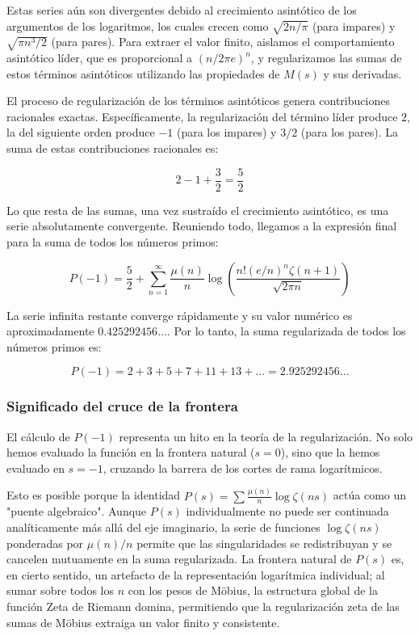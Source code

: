 Estas series aún son divergentes debido al crecimiento asintótico de los argumentos de los logaritmos, los cuales crecen como $\sqrt{2n/\pi}$ (para impares) y $\sqrt{\pi n^3/2}$ (para pares). Para extraer el valor finito, aislamos el comportamiento asintótico líder, que es proporcional a $(n/2\pi e)^n$, y regularizamos las sumas de estos términos asintóticos utilizando las propiedades de $M(s)$ y sus derivadas. 

El proceso de regularización de los términos asintóticos genera contribuciones racionales exactas. Específicamente, la regularización del término líder produce $2$, la del siguiente orden produce $-1$ (para los impares) y $3/2$ (para los pares). La suma de estas contribuciones racionales es:

$$ 2 - 1 + \frac{3}{2} = \frac{5}{2} $$

Lo que resta de las sumas, una vez sustraído el crecimiento asintótico, es una serie absolutamente convergente. Reuniendo todo, llegamos a la expresión final para la suma de todos los números primos:

$$ P(-1) = \frac{5}{2} + \sum_{n=1}^{\infty} \frac{\mu(n)}{n} \log \left( \frac{n! (e/n)^n \zeta(n+1)}{\sqrt{2\pi n}} \right) $$

La serie infinita restante converge rápidamente y su valor numérico es aproximadamente $0.425292456\dots$. Por lo tanto, la suma regularizada de todos los números primos es:

$$ P(-1) = 2 + 3 + 5 + 7 + 11 + 13 + \dots = 2.925292456\dots $$

\subsubsection{Significado del cruce de la frontera}

El cálculo de $P(-1)$ representa un hito en la teoría de la regularización. No solo hemos evaluado la función en la frontera natural ($s=0$), sino que la hemos evaluado en $s=-1$, cruzando la barrera de los cortes de rama logarítmicos. 

Esto es posible porque la identidad $P(s) = \sum \frac{\mu(n)}{n} \log \zeta(ns)$ actúa como un "puente algebraico". Aunque $P(s)$ individualmente no puede ser continuada analíticamente más allá del eje imaginario, la serie de funciones $\log \zeta(ns)$ ponderadas por $\mu(n)/n$ permite que las singularidades se redistribuyan y se cancelen mutuamente en la suma regularizada. La frontera natural de $P(s)$ es, en cierto sentido, un artefacto de la representación logarítmica individual; al sumar sobre todos los $n$ con los pesos de Möbius, la estructura global de la función Zeta de Riemann domina, permitiendo que la regularización zeta de las sumas de Möbius extraiga un valor finito y consistente. 


